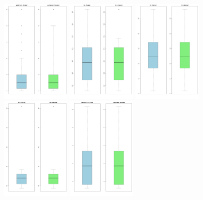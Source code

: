 \documentclass[12pt]{article}
\begin{document}
\begin{figure}[p]
  \includegraphics[width=0.299\textwidth]{OUTPUT/BOXPLOTS/gpdistroad.png}
  \includegraphics[width=0.299\textwidth]{OUTPUT/BOXPLOTS/lat.png}
  \includegraphics[width=0.299\textwidth]{OUTPUT/BOXPLOTS/lit.png}
  \includegraphics[width=0.299\textwidth]{OUTPUT/BOXPLOTS/lon.png}
  \includegraphics[width=0.299\textwidth]{OUTPUT/BOXPLOTS/meanscore.png}
  \label{fig:boxplots1}
\end{figure}
\end{document}
